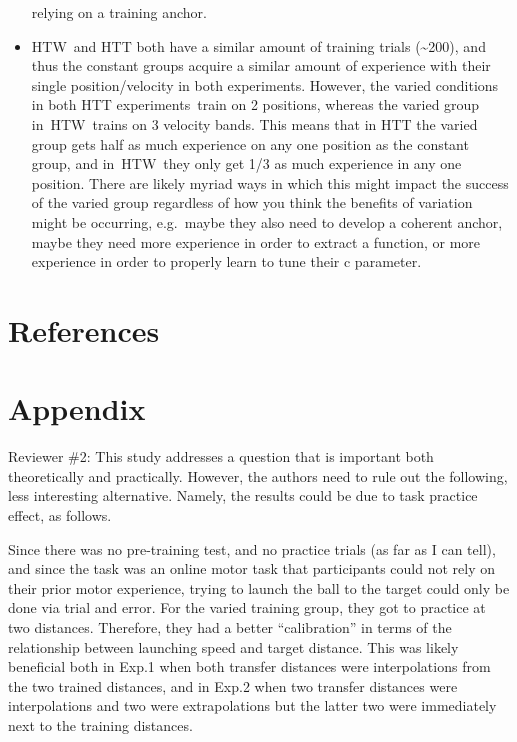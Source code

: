 \documentclass[
  12pt,
  letterpaper,
]{article}
\begin{document}
\begin{itemize}
  relying on a training anchor.~
\item
  HTW~and HTT both have a similar amount of training trials
  (\textasciitilde200), and thus the constant groups acquire a similar
  amount of experience with their single position/velocity in both
  experiments. However, the varied conditions in both HTT
  experiments~train on 2 positions, whereas the varied group
  in~HTW~trains on 3 velocity bands. This means that in HTT the varied
  group gets half as much experience on any one position as the constant
  group, and in~HTW~they only get 1/3 as much experience in any one
  position. There are likely myriad ways in which this might impact the
  success of the varied group regardless of how you think the benefits
  of variation might be occurring, e.g.~maybe they also need to develop
  a coherent anchor, maybe they need more experience in order to extract
  a function, or more experience in order to properly learn to tune
  their c parameter.~
\end{itemize}

\section{References}\label{references}


\section{Appendix}\label{appendix}

Reviewer \#2: This study addresses a question that is important both
theoretically and practically. However, the authors need to rule out the
following, less interesting alternative. Namely, the results could be
due to task practice effect, as follows.

Since there was no pre-training test, and no practice trials (as far as
I can tell), and since the task was an online motor task that
participants could not rely on their prior motor experience, trying to
launch the ball to the target could only be done via trial and error.
For the varied training group, they got to practice at two distances.
Therefore, they had a better ``calibration'' in terms of the
relationship between launching speed and target distance. This was
likely beneficial both in Exp.1 when both transfer distances were
interpolations from the two trained distances, and in Exp.2 when two
transfer distances were interpolations and two were extrapolations but
the latter two were immediately next to the training distances.
\end{document}
